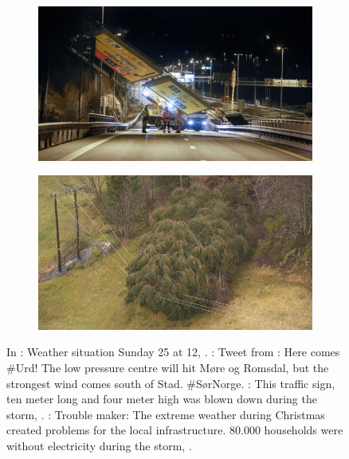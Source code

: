 \begin{figure}[h!]
\begin{subfigure}[b]{0.49\textwidth}
		\includegraphics[width=\textwidth]{./fig_introduction/street_sign_2512.jpg}
		\caption{}\label{fig:street_sign}
	\end{subfigure}
\hfill
	\begin{subfigure}[b]{0.49\textwidth}
		\includegraphics[width=\textwidth]{./fig_introduction/tree_nrk_2812.jpg}
		\caption{}\label{fig:tree_elec}
	\end{subfigure}
\caption{In \protect{}: Weather situation Sunday \SI{25}{\dec} at \SI{12}{\UTC}, \citep{olsen_ekstremvaerrapport._2017}.
	\protect{}: Tweet from \cite{meteorologene_her_2016}: Here comes \#Urd! The low pressure centre will hit M{\o}re og Romsdal, but the strongest wind comes south of Stad. \#S{\o}rNorge.
	\protect{}: This traffic sign, ten meter long and four meter high was blown down during the storm, \citep{ruud_tonn_2016}.
	\protect{}: Trouble maker: The extreme weather during Christmas created problems for the local infrastructure. \num{80.000} households were without electricity during the storm, \citep{farestveit_80.000_2016}.} \label{fig:news}
\end{figure}